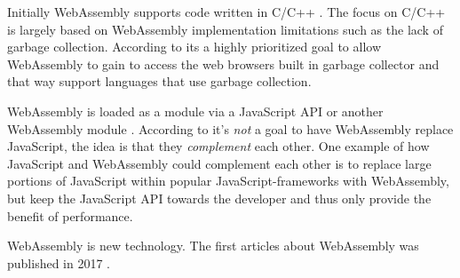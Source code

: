 Initially WebAssembly supports code written in C/C++ \parencite{HaasRossbergSchuffTitzerHolmanGohmanWagnerZakaiBastien2017}. 
The focus on C/C++ is largely based on WebAssembly implementation limitations such as the lack of garbage collection. According to \textcite{HaasRossbergSchuffTitzerHolmanGohmanWagnerZakaiBastien2017} its a highly prioritized goal to allow WebAssembly to gain to access the web browsers built in garbage collector and that way support languages that use garbage collection.

WebAssembly is loaded as a module via a JavaScript API or another WebAssembly module \parencite{HaasRossbergSchuffTitzerHolmanGohmanWagnerZakaiBastien2017}. According to \textcite{Moller2018} it's \emph{not} a goal to have WebAssembly replace JavaScript, the idea is that they \emph{complement} each other. One example of how JavaScript and WebAssembly could complement each other is to replace large portions of JavaScript within popular JavaScript-frameworks with WebAssembly, but keep the JavaScript API towards the developer and thus only provide the benefit of performance.

WebAssembly is new technology. The first articles about WebAssembly was published in 2017 \parencite{HaasRossbergSchuffTitzerHolmanGohmanWagnerZakaiBastien2017,ReiserBlaser2017}.
